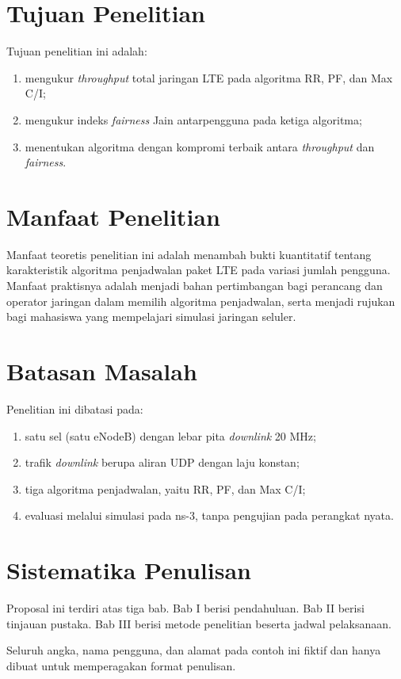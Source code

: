 \section{Tujuan Penelitian}
Tujuan penelitian ini adalah:
\begin{enumerate}
\item mengukur \textit{throughput} total jaringan LTE pada algoritma RR, PF, dan Max C/I;
\item mengukur indeks \textit{fairness} Jain antarpengguna pada ketiga algoritma;
\item menentukan algoritma dengan kompromi terbaik antara \textit{throughput} dan \textit{fairness}.
\end{enumerate}

\section{Manfaat Penelitian}
Manfaat teoretis penelitian ini adalah menambah bukti kuantitatif tentang karakteristik algoritma penjadwalan paket LTE pada variasi jumlah pengguna. Manfaat praktisnya adalah menjadi bahan pertimbangan bagi perancang dan operator jaringan dalam memilih algoritma penjadwalan, serta menjadi rujukan bagi mahasiswa yang mempelajari simulasi jaringan seluler.

\section{Batasan Masalah}
Penelitian ini dibatasi pada:
\begin{enumerate}
\item satu sel (satu eNodeB) dengan lebar pita \textit{downlink} 20 MHz;
\item trafik \textit{downlink} berupa aliran UDP dengan laju konstan;
\item tiga algoritma penjadwalan, yaitu RR, PF, dan Max C/I;
\item evaluasi melalui simulasi pada ns-3, tanpa pengujian pada perangkat nyata.
\end{enumerate}

\section{Sistematika Penulisan}
Proposal ini terdiri atas tiga bab. Bab I berisi pendahuluan. Bab II berisi tinjauan pustaka. Bab III berisi metode penelitian beserta jadwal pelaksanaan.

Seluruh angka, nama pengguna, dan alamat pada contoh ini fiktif dan hanya dibuat untuk memperagakan format penulisan.
